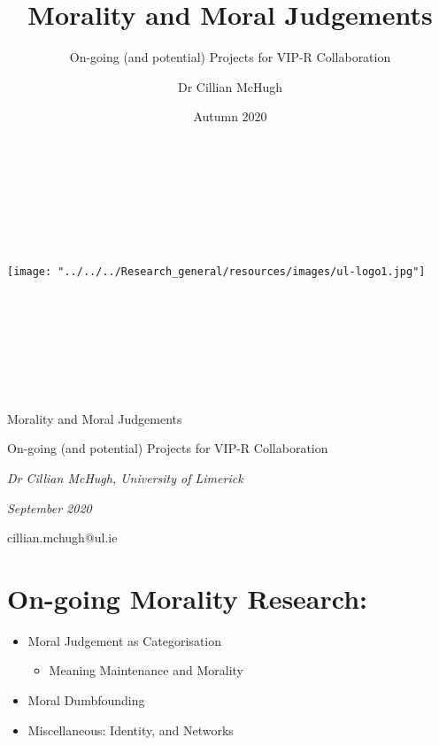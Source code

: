 \documentclass[
]{article}
\title{Morality and Moral Judgements}
\subtitle{On-going (and potential) Projects for VIP-R Collaboration}
\author{Dr Cillian McHugh}
\date{Autumn 2020}
\providecommand{\tightlist}{%
  \setlength{\itemsep}{0pt}\setlength{\parskip}{0pt}}
\begin{document}
\maketitle

\fancyhead{}
\fancyfoot{}
\fancyhead[LE,RO]{\thepage} 

~

~

~

\begin{center}
 \texttt{[image: "../../../Research\_general/resources/images/ul-logo1.jpg"]}
\end{center}

\raggedright

~

~

~

~

\renewcommand{\arraystretch}{1.5}

\begin{center}


\bigskip


\bigskip

\begin{huge} Morality and Moral Judgements
\end{huge}

\begin{large} On-going (and potential) Projects for VIP-R Collaboration

\textit{Dr Cillian McHugh, University of Limerick}

\textit{September 2020}


\bigskip


\bigskip

cillian.mchugh@ul.ie

\end{large}
\end{center}

\pagebreak

\hypertarget{on-going-morality-research}{%
\section{On-going Morality Research:}\label{on-going-morality-research}}

\begin{itemize}
\tightlist
\item
  Moral Judgement as Categorisation

  \begin{itemize}
  \tightlist
  \item
    Meaning Maintenance and Morality
  \end{itemize}
\item
  Moral Dumbfounding
\item
  Miscellaneous: Identity, and Networks
\end{itemize}
\end{document}
